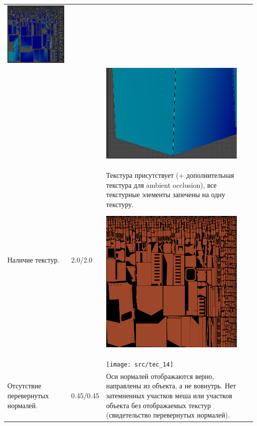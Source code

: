 \begin{longtable}{|p{4cm}|p{2.5cm}|p{7.5cm}|}
    \includegraphics[width=7cm]{src/uv_7}\\
    & & \includegraphics[width=7cm]{src/uv_8}\\
    \hline
    Наличие текстур. & 2.0/2.0 & Текстура присутствует (+ дополнительная текстура для ambient occlusion), все текстурные элементы запечены на одну текстуру.

    \includegraphics[width=7cm]{src/tec_13}\\
    & & \texttt{[image: src/tec\_14]}\\
    \hline
    Отсутствие перевернутых нормалей. & 0.45/0.45 & Оси нормалей отображаются верно, направлены из объекта, а не вовнутрь. Нет затемненных участков меша или участков объекта без отображаемых текстур (свидетельство перевернутых нормалей). 
    

\end{longtable}
